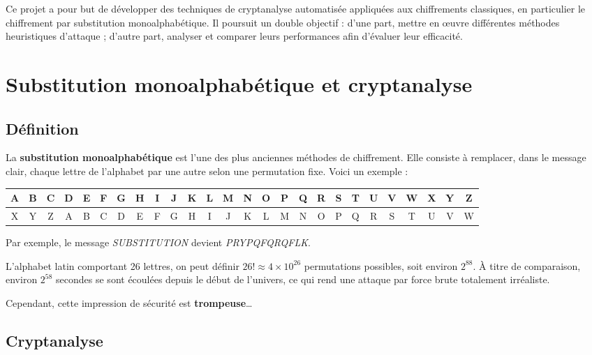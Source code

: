 \documentclass[a4paper]{article}
\begin{document}
Ce projet a pour but de développer des techniques de cryptanalyse automatisée appliquées aux chiffrements classiques, en particulier le chiffrement par substitution monoalphabétique. Il poursuit un double objectif : d’une part, mettre en œuvre différentes méthodes heuristiques d’attaque ; d’autre part, analyser et comparer leurs performances afin d’évaluer leur efficacité.

\section{Substitution monoalphabétique et cryptanalyse}

\subsection{Définition}

La \textbf{substitution monoalphabétique} est l’une des plus anciennes méthodes de chiffrement. Elle consiste à remplacer, dans le message clair, chaque lettre de l’alphabet par une autre selon une permutation fixe. Voici un exemple :

\vspace{1em}
\begin{adjustbox}{width=\textwidth,center}
    \begin{tabular}{|c|c|c|c|c|c|c|c|c|c|c|c|c|c|c|c|c|c|c|c|c|c|c|c|c|c|}
        \hline
        A & B & C & D & E & F & G & H & I & J & K & L & M & N & O & P & Q & R & S & T & U & V & W & X & Y & Z \\
        \hline
        X & Y & Z & A & B & C & D & E & F & G & H & I & J & K & L & M & N & O & P & Q & R & S & T & U & V & W \\
        \hline
    \end{tabular}
\end{adjustbox}
\vspace{1em}

Par exemple, le message \textit{SUBSTITUTION} devient \textit{PRYPQFQRQFLK}.

L’alphabet latin comportant 26 lettres, on peut définir $26! \approx 4 \times 10^{26}$ permutations possibles, soit environ $2^{88}$. À titre de comparaison, environ $2^{58}$ secondes se sont écoulées depuis le début de l’univers, ce qui rend une attaque par force brute totalement irréaliste.

Cependant, cette impression de sécurité est \textbf{trompeuse}\ldots

\subsection{Cryptanalyse}
\end{document}
